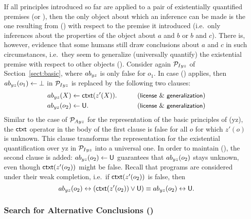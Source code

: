 \documentclass[12pt]{article}
\begin{document}
If all principles introduced so far are applied to a pair of existentially quantified premises
(\MI or \MO), then the only object about which an inference can be made is the one
resulting from () with respect to the premise it introduced (i.e.\ only inferences about the properties 
of the object about $a$ and $b$ or
$b$ and $c$). 
There is, however, evidence that some humans still draw conclusions about $a$ and $c$ in such
circumstances, i.e.\ they seem to generalize (universally quantify) the existential 
premise with respect to other objects (\negFailure).
Consider again ${\cal P}_{I yz}$ of Section~\ref{sect:basic}, where $ab_{yz}$ is only false for 
$o_1$. In case (\negFailure) applies, then $ab_{yz}(o_1) \leftarrow \bot$
in ${\cal P}_{I yz}$ is replaced by the following two clauses:
\begin{align}
\Ab_{yz}(X) & \leftarrow \cxt(z'(X)). & \tag{\licenses\ \&\ \negFailure} \\
\Ab_{yz}(o_2) & \leftarrow \udf. & \tag{\licenses\ \&\ \negFailure} 
\end{align}
Similar to the case of ${\cal P}_{Ayz}$ for the representation of the basic principles of (\MA yz),
the $\mathsf{ctxt}$ operator in the body of the first clause is false for all $o$
for which $z'(o)$ is unknown. This clause transforms the representation for the existential quantification over \MI yz in ${\cal P}_{Iyz}$
into a universal one. In order to maintain (\unknownGen), the second clause is added:
$ab_{yz}(o_2) \leftarrow \mathsf{U}$ guarantees that $ab_{yz}(o_2)$ stays unknown, even though $\mathsf{ctxt}(z'(o_2))$ might be false.
Recall that programs are considered under their weak completion, i.e.\ if $\mathsf{ctxt}(z'(o_2))$ is false, then
\[ab_{yz}(o_2) \leftrightarrow (\mathsf{ctxt}(z'(o_2)) \vee \mathsf{U})
 \equiv ab_{yz}(o_2) \leftrightarrow \mathsf{U}.\]




\subsubsection{Search for Alternative Conclusions (\abduction)}
\end{document}
